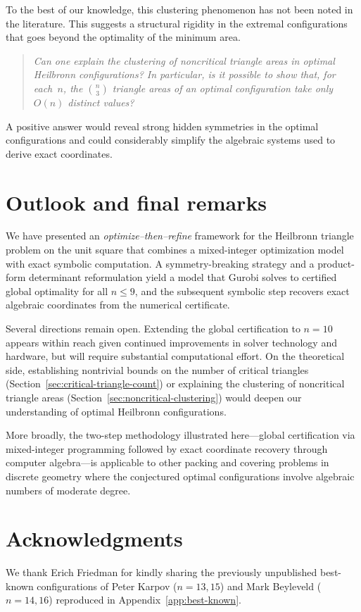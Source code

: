 \documentclass[11pt,a4paper]{article}
\theoremstyle{plain}
\theoremstyle{definition}
\theoremstyle{remark}
\begin{document}
To the best of our knowledge, this clustering phenomenon has not been noted in
the literature.  This suggests a structural rigidity in the extremal configurations
that goes beyond the optimality of the minimum area.

\begin{quote}
\emph{Can one explain the clustering of noncritical triangle areas in optimal
Heilbronn configurations?  In particular, is it possible to show that, for each~$n$,
the $\binom{n}{3}$ triangle areas of an optimal configuration take only
$O(n)$ distinct values?}
\end{quote}

A positive answer would reveal strong hidden symmetries in the optimal
configurations and could considerably simplify the algebraic systems used to
derive exact coordinates.


\section{Outlook and final remarks}\label{sec:outlook}

We have presented an \emph{optimize--then--refine} framework for the
Heilbronn triangle problem on the unit square that combines a
mixed-integer optimization model with exact symbolic computation.
A symmetry-breaking strategy and a product-form determinant
reformulation yield a model that Gurobi solves to certified global
optimality for all $n \le 9$, and the subsequent symbolic step
recovers exact algebraic coordinates from the numerical certificate.

Several directions remain open.
Extending the global certification to $n = 10$ appears within reach
given continued improvements in solver technology and hardware,
but will require substantial computational effort.
On the theoretical side, establishing nontrivial bounds on
the number of critical triangles (Section~\ref{sec:critical-triangle-count})
or explaining the clustering of noncritical triangle areas
(Section~\ref{sec:noncritical-clustering}) would deepen our
understanding of optimal Heilbronn configurations.

More broadly, the two-step methodology illustrated here---global
certification via mixed-integer programming followed by exact
coordinate recovery through computer algebra---is applicable
to other packing and covering problems in discrete geometry
where the conjectured optimal configurations involve
algebraic numbers of moderate degree.

\section*{Acknowledgments}
We thank Erich Friedman for kindly sharing the previously unpublished
best-known configurations of Peter Karpov ($n=13,15$) and Mark Beyleveld
($n=14,16$) reproduced in Appendix~\ref{app:best-known}.
\end{document}
